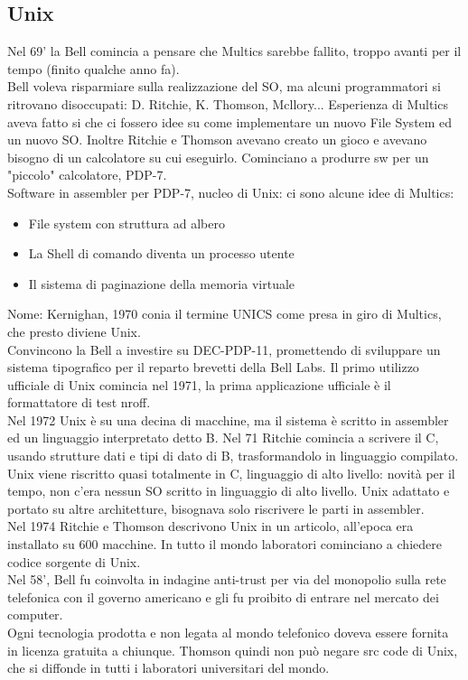 \documentclass[12pt, oneside]{extbook}
\begin{document}
\subsection{Unix}
Nel 69' la Bell comincia a pensare che Multics sarebbe fallito, troppo avanti per il tempo (finito qualche anno fa).\\ Bell voleva risparmiare sulla realizzazione del SO, ma alcuni programmatori si ritrovano disoccupati: D. Ritchie, K. Thomson, Mcllory... Esperienza di Multics aveva fatto si che ci fossero idee su come implementare un nuovo File System ed un nuovo SO. Inoltre Ritchie e Thomson avevano creato un gioco e avevano bisogno di un calcolatore su cui eseguirlo. Cominciano a produrre sw per un "piccolo" calcolatore, PDP-7.\\ Software in assembler per PDP-7, nucleo di Unix: ci sono alcune idee di Multics:
\begin{itemize}
\item File system con struttura ad albero
\item La Shell di comando diventa un processo utente
\item Il sistema di paginazione della memoria virtuale
\end{itemize}
Nome: Kernighan, 1970 conia il termine UNICS come presa in giro di Multics, che presto diviene Unix.\\ Convincono la Bell a investire su DEC-PDP-11, promettendo di sviluppare un sistema tipografico per il reparto brevetti della Bell Labs. Il primo utilizzo ufficiale di Unix comincia nel 1971, la prima applicazione ufficiale è il formattatore di test nroff.\\ Nel 1972 Unix è su una decina di macchine, ma il sistema è scritto in assembler ed un linguaggio interpretato detto B. Nel 71 Ritchie comincia a scrivere il C, usando strutture dati e tipi di dato di B, trasformandolo in linguaggio compilato. Unix viene riscritto quasi totalmente in C, linguaggio di alto livello: novità per il tempo, non c'era nessun SO scritto in linguaggio di alto livello. Unix adattato e portato su altre architetture, bisognava solo riscrivere le parti in assembler.\\ Nel 1974 Ritchie e Thomson descrivono Unix in un articolo, all'epoca era installato su 600 macchine. In tutto il mondo laboratori cominciano a chiedere codice sorgente di Unix.\\ Nel 58', Bell fu coinvolta in indagine anti-trust per via del monopolio sulla rete telefonica con il governo americano e gli fu proibito di entrare nel mercato dei computer.\\ Ogni tecnologia prodotta e non legata al mondo telefonico doveva essere fornita in licenza gratuita a chiunque. Thomson quindi non può negare src code di Unix, che si diffonde in tutti i laboratori universitari del mondo.
\end{document}

